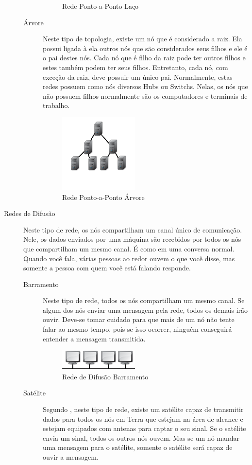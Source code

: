 \begin{description}
\begin{description}
\begin{figure}[!htb]
						\caption{Rede Ponto-a-Ponto Laço}
						\label{Rede Laço}
					\end{figure}
				\item[Árvore] Neste tipo de topologia, existe um nó que é considerado a raiz. Ela possui ligada à ela outros nós que são considerados seus filhos e ele é o pai destes nós. Cada nó que é filho da raiz pode ter outros filhos e estes também podem ter seus filhos. Entretanto, cada nó, com exceção da raiz, deve possuir um único pai. Normalmente, estas redes possuem como nós diversos Hubs ou Switchs. Nelas, os nós que não possuem filhos normalmente são os computadores e terminais de trabalho.
					\begin{figure}[!htb]
						\centering
						\includegraphics{img/arvore.jpg}
						\caption{Rede Ponto-a-Ponto Árvore}
						\label{Rede Árvore}
					\end{figure}
			\end{description}
		\item[Redes de Difusão] Neste tipo de rede, os nós compartilham um canal único de comunicação. Nele, os dados enviados por uma máquina são recebidos por todos os nós que compartilham um mesmo canal. É como em uma conversa normal. Quando você fala, várias pessoas ao redor ouvem o que você disse, mas somente a pessoa com quem você está falando responde.
			\begin{description}
				\item[Barramento] Neste tipo de rede, todos os nós compartilham um mesmo canal. Se algum dos nós enviar uma mensagem pela rede, todos os demais irão ouvir. Deve-se tomar cuidado para que mais de um nó não tente falar ao mesmo tempo, pois se isso ocorrer, ninguém conseguirá entender a mensagem transmitida.
				\begin{figure}[!htb]
					\centering
					\includegraphics{img/barramento.jpg}
					\caption{Rede de Difusão Barramento}
					\label{Rede Barramento}
				\end{figure}
				\item[Satélite] Segundo \cite{torres2015redes}, neste tipo de rede, existe um satélite capaz de transmitir dados para todos os nós em Terra que estejam na área de alcance e estejam equipados com antenas para captar o seu sinal. Se o satélite envia um sinal, todos os outros nós ouvem. Mas se um nó mandar uma mensagem para o satélite, somente o satélite será capaz de ouvir a mensagem.
			\end{description}
	\end{description}

